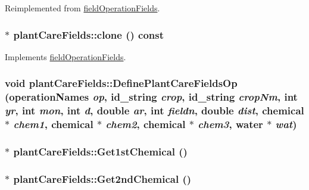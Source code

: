 Reimplemented from \hyperlink{classfield_operation_fields_aeb2bce9d4612033dbab366d870e432a6}{fieldOperationFields}.\hypertarget{classplant_care_fields_a9fc0efabe5abf7359f56514c889ca743}{
\subsubsection[{clone}]{ $\ast$ plantCareFields::clone () const}}
\label{classplant_care_fields_a9fc0efabe5abf7359f56514c889ca743}


Implements \hyperlink{classfield_operation_fields_ae5d8585b7e57196ce3801eed29677b3e}{fieldOperationFields}.\hypertarget{classplant_care_fields_ad77b3f991a2d5fbc396fc524fb77eb4e}{
\subsubsection[{DefinePlantCareFieldsOp}]{\setlength{\rightskip}{0pt plus 5cm}void plantCareFields::DefinePlantCareFieldsOp ({\bf operationNames} {\em op}, \/  {\bf id\_\-string} {\em crop}, \/  {\bf id\_\-string} {\em cropNm}, \/  int {\em yr}, \/  int {\em mon}, \/  int {\em d}, \/  double {\em ar}, \/  int {\em fieldn}, \/  double {\em dist}, \/  {\bf chemical} $\ast$ {\em chem1}, \/  {\bf chemical} $\ast$ {\em chem2}, \/  {\bf chemical} $\ast$ {\em chem3}, \/  {\bf water} $\ast$ {\em wat})}}
\label{classplant_care_fields_ad77b3f991a2d5fbc396fc524fb77eb4e}
\hypertarget{classplant_care_fields_a03226f11e808ffa15fb3f02b271109e4}{
\subsubsection[{Get1stChemical}]{$\ast$ plantCareFields::Get1stChemical ()}}
\label{classplant_care_fields_a03226f11e808ffa15fb3f02b271109e4}
\hypertarget{classplant_care_fields_a8f8e515e160373683a252690cc5f5cb2}{
\subsubsection[{Get2ndChemical}]{$\ast$ plantCareFields::Get2ndChemical ()}}
